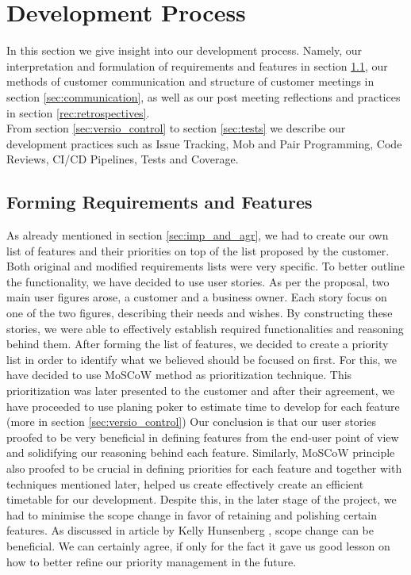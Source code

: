 \documentclass{l3proj}
\begin{document}
\section{Development Process}
\label{sec:dev_process}
    In this section we give insight into our development process. Namely, our interpretation and formulation of requirements and features in section \ref{sec:req_and_feat}, our methods of customer communication and structure of customer meetings in section \ref{sec:communication}, as well as our post meeting reflections and practices in section \ref{rec:retrospectives}.\\
    From section \ref{sec:versio_control} to section \ref{sec:tests} we describe our development practices such as Issue Tracking, Mob and Pair Programming, Code Reviews, CI/CD Pipelines, Tests and Coverage.
    
    \subsection{Forming Requirements and Features}
    \label{sec:req_and_feat}
        As already mentioned in section \ref{sec:imp_and_agr}, we had to create our own list of features and their priorities on top of the list proposed by the customer. Both original and modified requirements lists were very specific. To better outline the functionality, we have decided to use user stories. As per the proposal, two main user figures arose, a customer and a business owner. Each story focus on one of the two figures, describing their needs and wishes. By constructing these stories, we were able to effectively establish required functionalities and reasoning behind them.
        \newline
        \newline
        After forming the list of features, we decided to create a priority list in order to identify what we believed should be focused on first. For this, we have decided to use MoSCoW\cite{moscow} method as prioritization technique. This prioritization was later presented to the customer and after their agreement, we have proceeded to use planing poker to estimate time to develop for each feature (more in section \ref{sec:versio_control})
        \newline
        \newline
        Our conclusion is that our user stories proofed to be very beneficial in defining features from the end-user point of view and solidifying our reasoning behind each feature. Similarly, MoSCoW principle also proofed to be crucial in defining priorities for each feature and together with techniques mentioned later, helped us create effectively create an efficient timetable for our development. Despite this, in the later stage of the project, we had to minimise the scope change in favor of retaining and polishing certain features. As discussed in article by Kelly Hunsenberg \cite{change}, scope change can be beneficial. We can certainly agree, if only for the fact it gave us good lesson on how to better refine our priority management in the future. 
    
\end{document}
